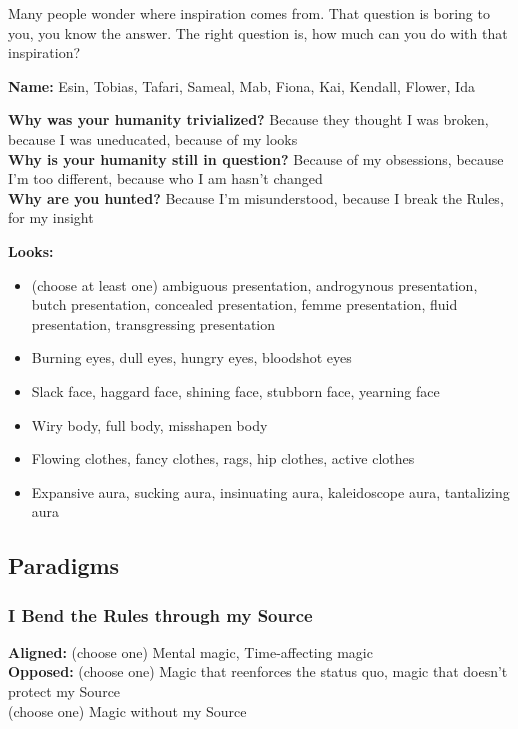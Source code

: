 \documentclass[
  oneside,
  statementpaper,
  9pt]{memoir}
\begin{document}
Many people wonder where inspiration comes from. That question is boring
to you, you know the answer. The right question is, how much can you do
with that inspiration?

\textbf{Name:} Esin, Tobias, Tafari, Sameal, Mab, Fiona, Kai, Kendall,
Flower, Ida

\textbf{Why was your humanity trivialized?} Because they thought I was
broken, because I was uneducated, because of my looks\\
\textbf{Why is your humanity still in question?} Because of my
obsessions, because I'm too different, because who I am hasn't changed\\
\textbf{Why are you hunted?} Because I'm misunderstood, because I break
the Rules, for my insight

\textbf{Looks:}

\begin{itemize}
\tightlist
\item
  (choose at least one) ambiguous presentation, androgynous
  presentation, butch presentation, concealed presentation, femme
  presentation, fluid presentation, transgressing presentation
\item
  Burning eyes, dull eyes, hungry eyes, bloodshot eyes
\item
  Slack face, haggard face, shining face, stubborn face, yearning face
\item
  Wiry body, full body, misshapen body
\item
  Flowing clothes, fancy clothes, rags, hip clothes, active clothes
\item
  Expansive aura, sucking aura, insinuating aura, kaleidoscope aura,
  tantalizing aura
\end{itemize}

\hypertarget{paradigms-2}{%
\subsection{Paradigms}\label{paradigms-2}}

\hypertarget{i-bend-the-rules-through-my-source}{%
\subsubsection{I Bend the Rules through my
Source}\label{i-bend-the-rules-through-my-source}}

\textbf{Aligned:} (choose one) Mental magic, Time-affecting magic\\
\textbf{Opposed:} (choose one) Magic that reenforces the status quo,
magic that doesn't protect my Source\\
(choose one) Magic without my Source
\end{document}
